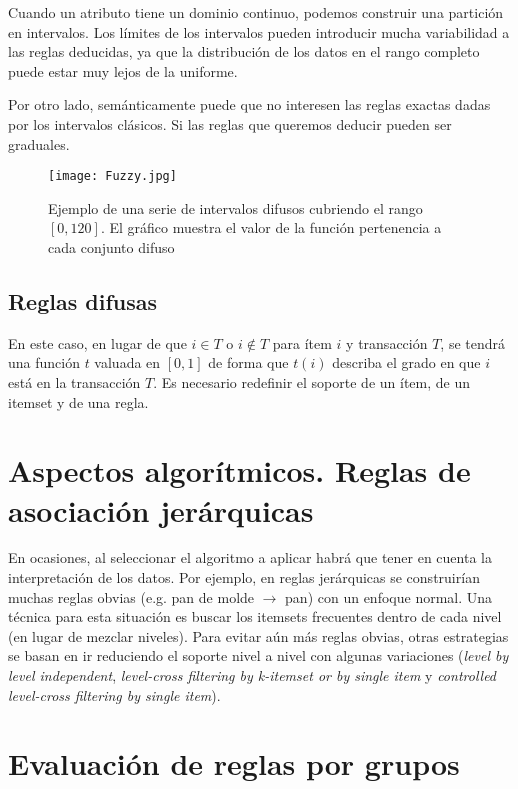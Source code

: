 \documentclass[a4paper,11pt,spanish]{report}
\let\stdsection\section
\let\stdsub\subsection
\let\stdsubsub\subsubsection
\renewcommand{\chapter}{\stdsection}
\renewcommand{\section}{\stdsub}
\renewcommand{\subsection}{\stdsubsub}
\begin{document}
Cuando un atributo tiene un dominio continuo, podemos construir una partición en intervalos. Los límites de los intervalos pueden introducir mucha variabilidad a las reglas deducidas, ya que la distribución de los datos en el rango completo puede estar muy lejos de la uniforme.

Por otro lado, semánticamente puede que no interesen las reglas exactas dadas por los intervalos clásicos. Si las reglas que queremos deducir pueden ser graduales.

\begin{figure}[htbp]
\centering
\texttt{[image: Fuzzy.jpg]}
\caption{\label{fig.fuz}Ejemplo de una serie de intervalos difusos cubriendo el rango $[0,120]$. El gráfico muestra el valor de la función pertenencia a cada conjunto difuso}
\end{figure}

\section{Reglas difusas}
\label{sec-4-4-3}

En este caso, en lugar de que $i\in T$ o $i\notin T$ para ítem $i$ y transacción $T$, se tendrá una función $t$ valuada en $[0,1]$ de forma que $t(i)$ describa el grado en que $i$ está en la transacción $T$. Es necesario redefinir el soporte de un ítem, de un itemset y de una regla.


\chapter{Aspectos algorítmicos. Reglas de asociación jerárquicas}
\label{sec-4-5}

En ocasiones, al seleccionar el algoritmo a aplicar habrá que tener en cuenta la interpretación de los datos. Por ejemplo, en reglas jerárquicas se construirían muchas reglas obvias (e.g. pan de molde $\rightarrow$ pan) con un enfoque normal. Una técnica para esta situación es buscar los itemsets frecuentes dentro de cada nivel (en lugar de mezclar niveles). Para evitar aún más reglas obvias, otras estrategias se basan en ir reduciendo el soporte nivel a nivel con algunas variaciones (\emph{level by level independent}, \emph{level-cross filtering by k-itemset or by single item} y \emph{controlled level-cross filtering by single item}).

\chapter{Evaluación de reglas por grupos}
\label{sec-4-6}
\end{document}
